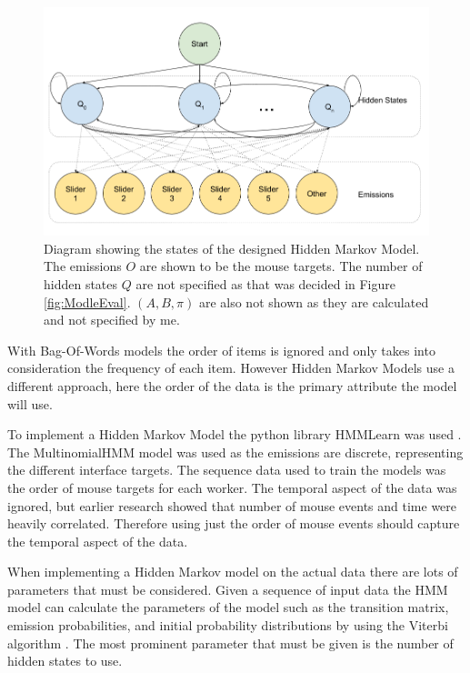 \documentclass{article}
\begin{document}
\begin{figure}[ht]
    \centering
    \includegraphics[scale=0.45]{Images/My HMM.png}
    \caption{
        Diagram showing the states of the designed Hidden Markov Model.
        The emissions $O$ are shown to be the mouse targets.
        The number of hidden states $Q$ are not specified as that was decided in Figure \ref{fig:ModleEval}.
        $(A,B,\pi)$ are also not shown as they are calculated and not specified by me.
    }
    \label{fig:MyHMM}
\end{figure}

With Bag-Of-Words models the order of items is ignored and only takes into consideration the frequency of each item.
However Hidden Markov Models use a different approach, here the order of the data is the primary attribute the model will use.

To implement a Hidden Markov Model the python library HMMLearn was used \cite{hmmlearn}.
The MultinomialHMM model was used as the emissions are discrete, representing the different interface targets.
The sequence data used to train the models was the order of mouse targets for each worker.
The temporal aspect of the data was ignored, but earlier research showed that number of mouse events and time were heavily correlated.
Therefore using just the order of mouse events should capture the temporal aspect of the data.

When implementing a Hidden Markov model on the actual data there are lots of parameters that must be considered. 
Given a sequence of input data the HMM model can calculate the parameters of the model such as the transition matrix, emission probabilities, and initial probability distributions by using the Viterbi algorithm \cite{hmmlearn}.
The most prominent parameter that must be given is the number of hidden states to use.
\end{document}
